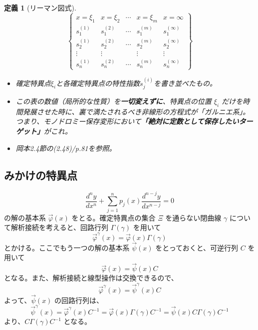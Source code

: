 \documentclass[paper=a4, fontsize=11pt]{jlreq} %
\theoremstyle{break}
\newtheorem{definition}[theorem]{定義}
\theoremstyle{qa}
\theoremstyle{remark} %
\begin{document}
\begin{definition}[リーマン図式]%
    \[
    \left\{
    \begin{matrix}
        x = \xi_1 & x = \xi_2 & \cdots & x = \xi_m & x = \infty \\
        s_1^{(1)} & s_1^{(2)} & \cdots & s_1^{(m)} & s_1^{(\infty)} \\
        s_2^{(1)} & s_2^{(2)} & \cdots & s_2^{(m)} & s_2^{(\infty)} \\
        \vdots    & \vdots    &        & \vdots    & \vdots \\
        s_n^{(1)} & s_n^{(2)} & \cdots & s_n^{(m)} & s_n^{(\infty)}
    \end{matrix}
    \right\}
    \]
    \begin{itemize}
        \item[\textbf{Type:}] 確定特異点$\xi_{i}$と各確定特異点の特性指数$s_j^{(i)}$を書き並べたもの。
        \item[\textbf{Insight:}] この表の数値（局所的な性質）を\textbf{一切変えずに}、特異点の位置 $\xi_i$ だけを時間発展させた時に、裏で満たされるべき非線形の方程式が「ガルニエ系」。つまり、モノドロミー保存変形において\textbf{「絶対に定数として保存したいターゲット」}がこれ。
        \item[\textbf{Link:}] 岡本2.4節の(2.48)/p.81を参照。
    \end{itemize}
\end{definition}

\subsection{みかけの特異点}

\begin{equation}\label{eq:fuchs_n_order}
    \frac{d^{n}y}{dx^{n}}+\sum_{j=1}^{n} p_{j}(x)\frac{d^{n-j}y}{dx^{n-j}} = 0   
\end{equation}
の解の基本系 $\vec{\varphi}(x)$ をとる。確定特異点の集合 $\Xi$ を通らない閉曲線 $\gamma$ について解析接続を考えると、回路行列 $\Gamma(\gamma)$ を用いて
\[
\vec{\varphi}^{\gamma}(x) = \vec{\varphi}(x)\Gamma(\gamma)
\]
とかける。ここでもう一つの解の基本系 $\vec{\psi}(x)$ をとっておくと、可逆行列 $C$ を用いて
\[
\vec{\varphi}(x) = \vec{\psi}(x)C
\]
となる。また、解析接続と線型操作は交換できるので、
\[
\vec{\varphi}^{\gamma}(x) = \vec{\psi}^{\gamma}(x)C
\]
よって、$\vec{\psi}(x)$ の回路行列は、
\[
\vec{\psi}^{\gamma}(x) = \vec{\varphi}^{\gamma}(x)C^{-1} = \vec{\varphi}(x)\Gamma(\gamma)C^{-1} = \vec{\psi}(x)C\Gamma(\gamma)C^{-1}
\]
より、$C\Gamma(\gamma)C^{-1}$ となる。
\end{document}

